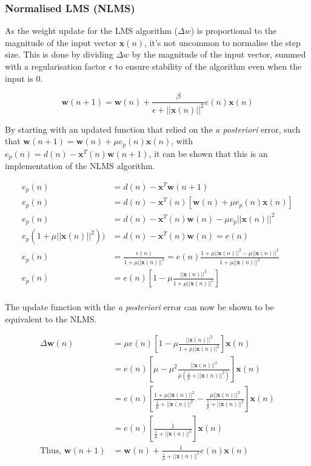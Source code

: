 \documentclass[main.tex]{subfiles}
\begin{document}
\subsubsection{Normalised LMS (NLMS)}

As the weight update for the LMS algorithm ($\Delta w$) is proportional to the magnitude of the input vector $\textbf{x}(n)$, it's not uncommon to normalise the step size. This is done by dividing $\Delta w$ by the magnitude of the input vector, summed with a regularisation factor $\epsilon$ to ensure stability of the algorithm even when the input is 0.

\begin{equation}
\textbf{w}(n+1) = \textbf{w}(n) + \frac{\beta}{\epsilon + ||\textbf{x}(n)||^2}e(n)\textbf{x}(n) \label{eq:3-2-2-nlms}
\end{equation}

By starting with an updated function that relied on the \textit{a posteriori} error, such that $\textbf{w}(n+1) = \textbf{w}(n) + \mu e_p(n)\textbf{x}(n)$, with $e_p(n) = d(n) - \textbf{x}^T(n)\textbf{w}(n+1)$, it can be shown that this is an implementation of the NLMS algorithm.

\begin{align*}
e_p(n) &= d(n) - \textbf{x}^T\textbf{w}(n+1)\\
e_p(n) &= d(n) - \textbf{x}^T(n)\left[\textbf{w}(n)+\mu e_p(n)\textbf{x}(n)\right]\\
e_p(n) &= d(n) - \textbf{x}^T(n)\textbf{w}(n) - \mu e_p||\textbf{x}(n)||^2\\
e_p(1+\mu||\textbf{x}(n)||^2)) &= d(n)-\textbf{x}^T(n)\textbf{w}(n) = e(n)\\
e_p(n) &= \frac{e(n)}{1+\mu||\textbf{x}(n)||^2} = e(n)\frac{1+\mu||\textbf{x}(n)||^2-\mu||\textbf{x}(n)||^2}{1+\mu||\textbf{x}(n)||^2}\\
e_p(n) &= e(n)\left[1 - \mu\frac{||\textbf{x}(n)||^2}{1+\mu||\textbf{x}(n)||^2}\right]\\
\end{align*}

The update function with the \textit{a posteriori} error can now be shown to be equivalent to the NLMS.

\begin{align*}
\Delta \textbf{w}(n) &= \mu e(n)\left[1-\mu\frac{||\textbf{x}(n)||^2}{1+\mu||\textbf{x}(n)||^2}\right]\textbf{x}(n)\\
&= e(n)\left[\mu-\mu^2\frac{||\textbf{x}(n)||^2}{\mu\left(\frac{1}{\mu}+||\textbf{x}(n)||^2\right)}\right]\textbf{x}(n)\\
&= e(n)\left[\frac{1+\mu||\textbf{x}(n)||^2}{\frac{1}{\mu}+||\textbf{x}(n)||^2}-\frac{\mu||\textbf{x}(n)||^2}{\frac{1}{\mu}+||\textbf{x}(n)||^2}\right]\textbf{x}(n)\\
&= e(n)\left[\frac{1}{\frac{1}{\mu}+||\textbf{x}(n)||^2}\right]\textbf{x}(n)\\
\text{Thus,\ \ } \textbf{w}(n+1) &= \textbf{w}(n) + \frac{1}{\frac{1}{\mu}+||\textbf{x}(n)||^2}e(n)\textbf{x}(n)
\end{align*}
\end{document}
